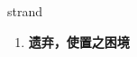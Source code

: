 
\begin{frame}
{\huge strand}
\begin{center}
\begin{enumerate}\Large
  \item \textbf{遗弃，使置之困境}
\end{enumerate}
\end{center}
\end{frame}

